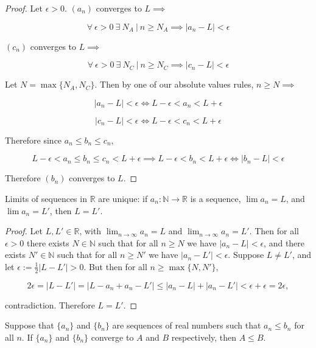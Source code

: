 \begin{proof} Let \(\epsilon >0\). \((a_n)\) converges to \(L \implies\)

\[
\forall \ \epsilon> 0 \ \exists \ N_A \ | \ n \geq N_A \implies | a_n - L | < \epsilon 
\]

\((c_n)\) converges to \(L \implies\)

\[
\forall \ \epsilon> 0 \ \exists \ N_C \ | \ n \geq N_C \implies | c_n - L | < \epsilon 
\]

Let \(N = \max \{N_A, N_C\} \). Then by one of our absolute values rules, \(n \geq N \implies\)

\[
| a_n - L | < \epsilon \iff L - \epsilon < a_n < L + \epsilon
\]

\[
| c_n - L | < \epsilon \iff L - \epsilon < c_n < L + \epsilon
\]

Therefore since \(a_n \leq b_n \leq c_n\),

\[
 L - \epsilon < a_n \leq b_n \leq c_n < L + \epsilon \implies L - \epsilon < b_n < L + \epsilon \iff | b_n - L | < \epsilon
\]

Therefore \((b_n)\) converges to \(L\).

\end{proof}

\begin{proposition} 
Limits of sequences in $\mathbb{R}$ are unique: if $a_n: \mathbb{N} \to \mathbb{R}$ is a sequence, $\lim a_n = L$, and $\lim a_n = L'$, then $L = L'$. 
\end{proposition}

\begin{proof}
Let \(L, L' \in \mathbb{R}\), with \(\lim_{n \to \infty} a_n = L\) and \(\lim_{n \to \infty} a_n = L'\). Then for all \(\epsilon > 0\) there exists \(N \in \mathbb{N}\) such that for all \(n \geq N\) we have \(|a_n - L| < \epsilon\), and there exists \(N' \in \mathbb{N}\) such that for all \(n \geq N'\) we have \(|a_n - L'| < \epsilon\). Suppose \(L \neq L'\), and let \(\epsilon := \frac{1}{2}|L - L'|  > 0\). But then for all \(n \geq \max\{N, N'\}\),

\[
2 \epsilon = |L - L'| = |L - a_n + a_n - L'|  \leq |a_n - L| + |a_n - L'| < \epsilon + \epsilon = 2 \epsilon,
\]

contradiction. Therefore \(L = L'\).

\end{proof}

\begin{theorem} Suppose that \(\{a_n\}\) and \(\{b_n\}\) are sequences of real numbers such that \(a_n \leq b_n\) for all \(n\). If \(\{a_n\}\) and \(\{b_n\}\) converge to \(A\) and \(B\) respectively, then \(A \leq B\).

\end{theorem}

